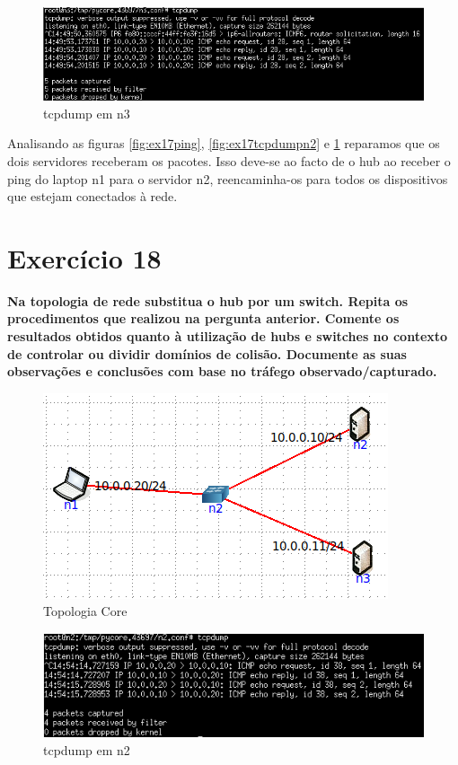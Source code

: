 \documentclass[a4paper]{report}
\begin{document}
\begin{figure}[H]
    \centering 
    \includegraphics[width=\textwidth]{images/ex17tcpdumpn3.png}
    \caption{tcpdump em n3}
    \label{fig:ex17tcpdumpn3}
\end{figure}
Analisando as figuras \ref{fig:ex17ping}, \ref{fig:ex17tcpdumpn2} e 
\ref{fig:ex17tcpdumpn3} reparamos que os dois servidores receberam os pacotes.
Isso deve-se ao facto de o hub ao receber o ping do laptop n1 para o servidor
n2, reencaminha-os para todos os dispositivos que estejam conectados à rede.

\section{Exercício 18}
\textbf{Na topologia de rede substitua o hub por um switch. Repita os
procedimentos que realizou na pergunta anterior. Comente os resultados obtidos
quanto à utilização de hubs e switches no contexto de controlar ou dividir
domínios de colisão. Documente as suas observações e conclusões com base no
tráfego observado/capturado.}

\begin{figure}[H]
    \centering 
    \includegraphics[width=\textwidth]{images/ex18topologiacore.png}
    \caption{Topologia Core}
    \label{fig:ex18topologiacore}
\end{figure}

\begin{figure}[H]
    \centering 
    \includegraphics[width=\textwidth]{images/ex18tcpdumpn2.png}
    \caption{tcpdump em n2}
    \label{fig:ex18tcpdumpn2}
\end{figure}
\end{document}
